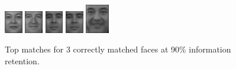 \begin{figure}[hbt]
  \includegraphics[width=0.07\textwidth]{../results/H_rez/correct90/3/6.jpg}
  \includegraphics[width=0.07\textwidth]{../results/H_rez/correct90/3/7.jpg}
  \includegraphics[width=0.07\textwidth]{../results/H_rez/correct90/3/8.jpg}
  \includegraphics[width=0.07\textwidth]{../results/H_rez/correct90/3/8.jpg}
  \includegraphics[width=0.09\textwidth]{../results/H_rez/correct90/3/10.jpg}
  \caption{Top matches for 3 correctly matched faces at 90\% information retention.}
  \label{fig:correct90}
\end{figure}

~\vfill


